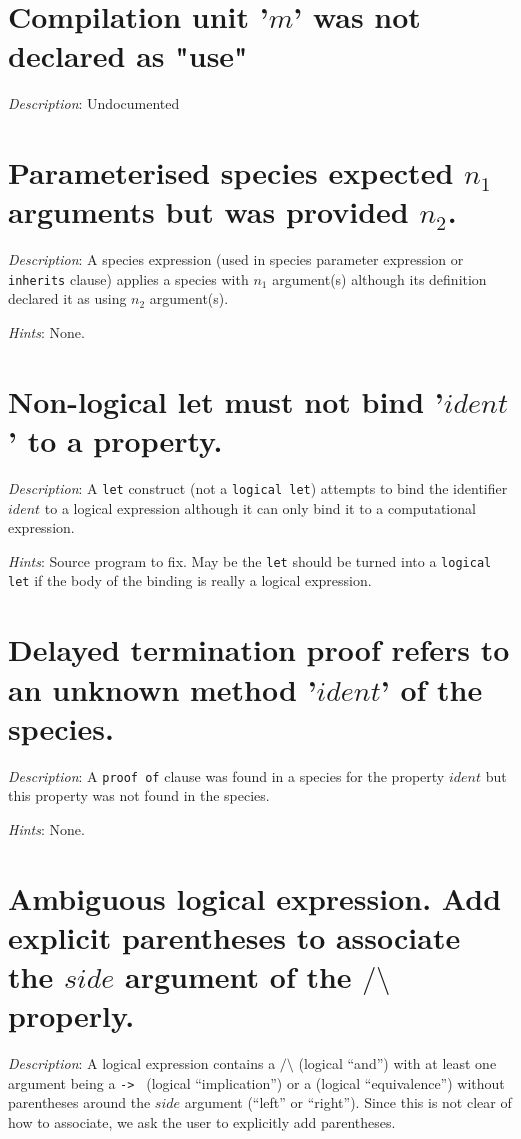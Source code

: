 \section*{Compilation unit '$m$' was not declared as "use"}
{\em Description}: Undocumented




\section*{Parameterised species  expected $n_1$ arguments but
  was provided $n_2$.}
{\em Description}: A species expression (used in species parameter
expression or {\tt inherits} clause) applies a species with $n_1$
argument(s) although its definition declared it as using $n_2$
argument(s).

{\em Hints}: None.



\section*{Non-logical let must not bind '$ident$' to a property.}
{\em Description}: A {\tt let} construct (not a {\tt logical let})
attempts to bind the identifier $ident$ to a logical expression
although it can only bind it to a computational expression.

{\em Hints}: Source program to fix. May be the {\tt let} should be
turned into a {\tt logical let} if the body of the binding is really a
logical expression.



\section*{Delayed termination proof refers to an unknown method
  '$ident$' of the species.}
{\em Description}: A {\tt proof of} clause was found in a species for
the property $ident$ but this property was not found in the species.

{\em Hints}: None.



\section*{Ambiguous logical expression. Add explicit parentheses to
  associate the $side$ argument of the $/\setminus$ properly.}
{\em Description}: A logical expression contains a
{\tt $/\setminus$} (logical ``and'') with at least one argument being a
{\tt -> } (logical ``implication'') or a {\tt <->} (logical
``equivalence'') without parentheses around the $side$ argument (``left''
or ``right''). Since this is not clear of how to associate, we  ask the user to explicitly add parentheses.

